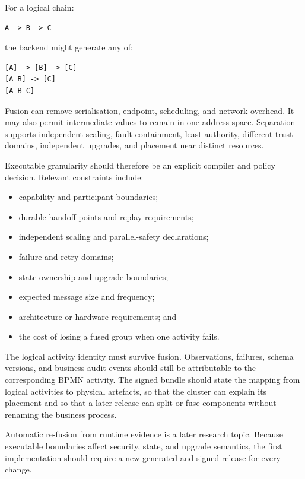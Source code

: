 For a logical chain:

\begin{verbatim}
A -> B -> C
\end{verbatim}

the backend might generate any of:

\begin{verbatim}
[A] -> [B] -> [C]
[A B] -> [C]
[A B C]
\end{verbatim}

Fusion can remove serialisation, endpoint, scheduling, and network overhead. It
may also permit intermediate values to remain in one address space. Separation
supports independent scaling, fault containment, least authority, different
trust domains, independent upgrades, and placement near distinct resources.

Executable granularity should therefore be an explicit compiler and policy
decision. Relevant constraints include:

\begin{itemize}
    \item capability and participant boundaries;
    \item durable handoff points and replay requirements;
    \item independent scaling and parallel-safety declarations;
    \item failure and retry domains;
    \item state ownership and upgrade boundaries;
    \item expected message size and frequency;
    \item architecture or hardware requirements; and
    \item the cost of losing a fused group when one activity fails.
\end{itemize}

The logical activity identity must survive fusion. Observations, failures,
schema versions, and business audit events should still be attributable to the
corresponding BPMN activity. The signed bundle should state the mapping from
logical activities to physical artefacts, so that the cluster can explain its
placement and so that a later release can split or fuse components without
renaming the business process.

Automatic re-fusion from runtime evidence is a later research topic. Because
executable boundaries affect security, state, and upgrade semantics, the first
implementation should require a new generated and signed release for every
change.

